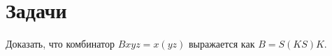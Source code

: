 \section*{Задачи}

\begin{task}
    Доказать, что комбинатор $Bxyz=x(yz)$ выражается как $B=S(KS)K$.
\end{task}